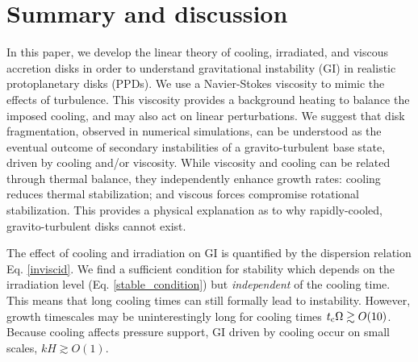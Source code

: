 \section{Summary and discussion}\label{summary}
In this paper, we develop the linear theory of cooling, irradiated,
and viscous accretion disks in order to understand gravitational
instability (GI) in realistic protoplanetary disks (PPDs). 
We use a Navier-Stokes viscosity to mimic the effects of
turbulence. %
This viscosity provides a background heating to balance the imposed cooling,  
and may also act on linear perturbations. %
We suggest that disk fragmentation, observed in numerical simulations, 
can be understood as the eventual outcome of secondary
instabilities of a gravito-turbulent base state, driven by cooling
and/or viscosity.     
While viscosity and cooling can be related through thermal
balance, they independently enhance growth rates: cooling reduces
thermal stabilization; and viscous forces compromise rotational
stabilization. This provides a physical explanation as to why
rapidly-cooled, gravito-turbulent disks cannot exist. 


The effect of cooling and irradiation on GI is quantified by the 
dispersion relation 
Eq. \ref{inviscid}. We find a sufficient condition for stability which  
depends on the irradiation level (Eq. \ref{stable_condition}) but 
\emph{independent} of the cooling time. 
This means that long cooling times can still  
formally lead to instability. However, growth timescales may be 
uninterestingly long for cooling times $t_\mathrm{c}\Omega\gtrsim 
O(10)$. Because cooling affects pressure support, GI driven by cooling
occur on small scales, $kH\gtrsim O(1)$.   


